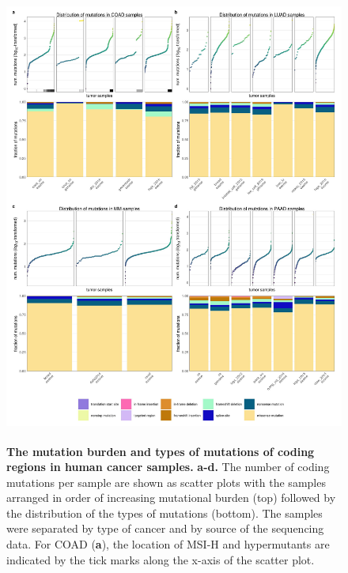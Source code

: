 \documentclass[english, 10pt, letterpaper]{article}
\begin{document}
\begin{figure}[p]
\centering
\includegraphics[height=150mm]{figures/Supp_Fig_3.jpeg}
\caption{
    \textbf{The mutation burden and types of mutations of coding regions in human cancer samples.}
    \textbf{a-d.} The number of coding mutations per sample are shown as scatter plots with the samples arranged in order of increasing mutational burden (top) followed by the distribution of the types of mutations (bottom). The samples were separated by type of cancer and by source of the sequencing data.
    For COAD (\textbf{a}), the location of MSI-H and hypermutants are indicated by the tick marks along the x-axis of the scatter plot.
}
\label{sfig:mutation-burden-of-cancer-samples}
\end{figure}
\end{document}

